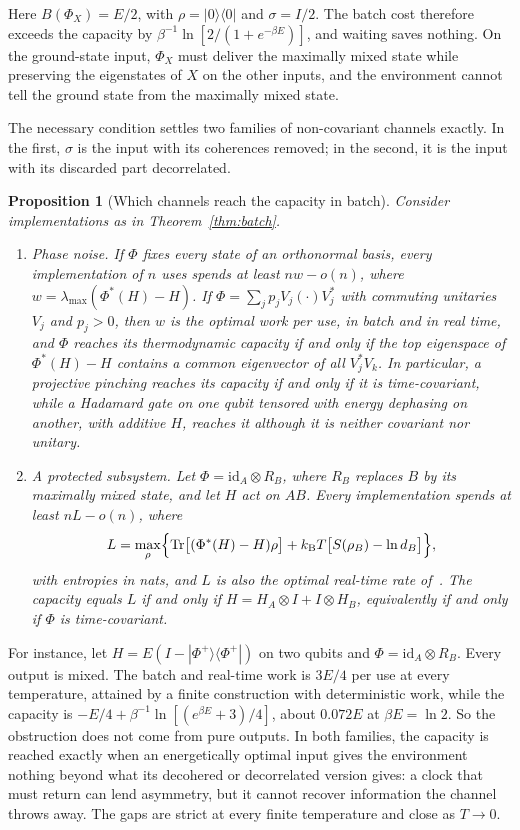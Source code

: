\documentclass[11pt]{article}
\newtheorem{proposition}[theorem]{Proposition}
\theoremstyle{definition}
\theoremstyle{remark}
\newcommand{\Tr}{\operatorname{Tr}}
\newcommand{\kB}{k_{\mathrm B}}
\begin{document}
Here $B(\Phi_X)=E/2$, with $\rho=|0\rangle\langle0|$ and $\sigma=I/2$. The batch cost therefore exceeds the capacity by $\beta^{-1}\ln[2/(1+e^{-\beta E})]$, and waiting saves nothing. On the ground-state input, $\Phi_X$ must deliver the maximally mixed state while preserving the eigenstates of $X$ on the other inputs, and the environment cannot tell the ground state from the maximally mixed state.

The necessary condition settles two families of non-covariant channels exactly. In the first, $\sigma$ is the input with its coherences removed; in the second, it is the input with its discarded part decorrelated.

\begin{proposition}[Which channels reach the capacity in batch]\label{prop:families}
Consider implementations as in Theorem~\ref{thm:batch}.
\begin{enumerate}[label=(\alph*)]
\item \emph{Phase noise.} If $\Phi$ fixes every state of an orthonormal basis, every implementation of $n$ uses spends at least $nw-o(n)$, where $w=\lambda_{\max}(\Phi^*(H)-H)$. If $\Phi=\sum_jp_jV_j(\cdot)V_j^*$ with commuting unitaries $V_j$ and $p_j>0$, then $w$ is the optimal work per use, in batch and in real time, and $\Phi$ reaches its thermodynamic capacity if and only if the top eigenspace of $\Phi^*(H)-H$ contains a common eigenvector of all $V_j^*V_k$. In particular, a projective pinching reaches its capacity if and only if it is time-covariant, while a Hadamard gate on one qubit tensored with energy dephasing on another, with additive $H$, reaches it although it is neither covariant nor unitary.
\item \emph{A protected subsystem.} Let $\Phi=\mathrm{id}_A\otimes R_B$, where $R_B$ replaces $B$ by its maximally mixed state, and let $H$ act on $AB$. Every implementation spends at least $nL-o(n)$, where
\[
L=\max_\rho\Bigl\{\Tr\bigl[(\Phi^*(H)-H)\rho\bigr]+\kB T\bigl[S(\rho_B)-\ln d_B\bigr]\Bigr\},
\]
with entropies in nats, and $L$ is also the optimal real-time rate of~\cite{SaveWork}. The capacity equals $L$ if and only if $H=H_A\otimes I+I\otimes H_B$, equivalently if and only if $\Phi$ is time-covariant.
\end{enumerate}
\end{proposition}

For instance, let $H=E(I-|\Phi^+\rangle\langle\Phi^+|)$ on two qubits and $\Phi=\mathrm{id}_A\otimes R_B$. Every output is mixed. The batch and real-time work is $3E/4$ per use at every temperature, attained by a finite construction with deterministic work, while the capacity is $-E/4+\beta^{-1}\ln[(e^{\beta E}+3)/4]$, about $0.072E$ at $\beta E=\ln2$. So the obstruction does not come from pure outputs. In both families, the capacity is reached exactly when an energetically optimal input gives the environment nothing beyond what its decohered or decorrelated version gives: a clock that must return can lend asymmetry, but it cannot recover information the channel throws away. The gaps are strict at every finite temperature and close as $T\to0$.
\end{document}
